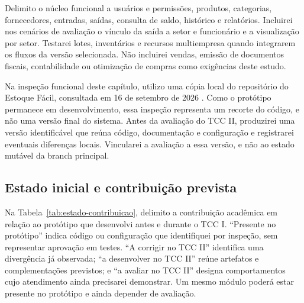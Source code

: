 Delimito o núcleo funcional a usuários e permissões, produtos, categorias, fornecedores, entradas, saídas, consulta de saldo, histórico e relatórios. Incluirei nos cenários de avaliação o vínculo da saída a setor e funcionário e a visualização por setor. Testarei lotes, inventários e recursos multiempresa quando integrarem os fluxos da versão selecionada. Não incluirei vendas, emissão de documentos fiscais, contabilidade ou otimização de compras como exigências deste estudo.

Na inspeção funcional deste capítulo, utilizo uma cópia local do repositório do Estoque Fácil, consultada em 16 de setembro de 2026 \cite{EstoqueFacilRepositorio}. Como o protótipo permanece em desenvolvimento, essa inspeção representa um recorte do código, e não uma versão final do sistema. Antes da avaliação do TCC II, produzirei uma versão identificável que reúna código, documentação e configuração e registrarei eventuais diferenças locais. Vincularei a avaliação a essa versão, e não ao estado mutável da branch principal.

\subsection{Estado inicial e contribuição prevista}
\label{sec:estado-contribuicao}

Na Tabela~\ref{tab:estado-contribuicao}, delimito a contribuição acadêmica em relação ao protótipo que desenvolvi antes e durante o TCC I. ``Presente no protótipo'' indica código ou configuração que identifiquei por inspeção, sem representar aprovação em testes. ``A corrigir no TCC II'' identifica uma divergência já observada; ``a desenvolver no TCC II'' reúne artefatos e complementações previstos; e ``a avaliar no TCC II'' designa comportamentos cujo atendimento ainda precisarei demonstrar. Um mesmo módulo poderá estar presente no protótipo e ainda depender de avaliação.

